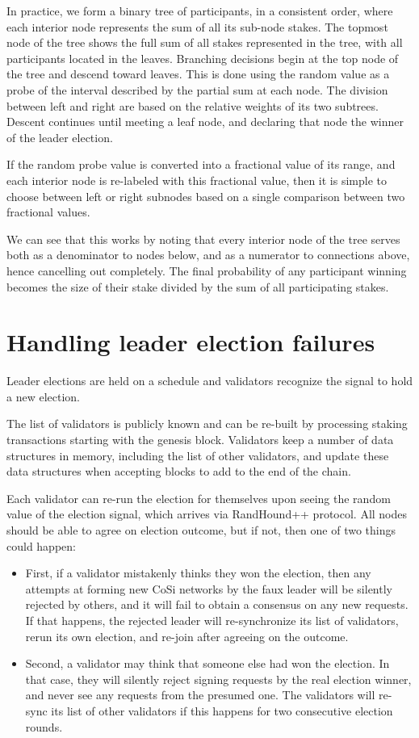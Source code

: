 \documentclass[8pt,fleqn,openany]{book}
\begin{document}
In practice, we form a binary tree of participants, in a consistent order, where each interior node represents the sum of all its sub-node stakes. The topmost node of the tree shows the full sum of all stakes represented in the tree, with all participants located in the leaves. Branching decisions begin at the top node of the tree and descend toward leaves. This is done using the random value as a probe of the interval described by the partial sum at each node. The division between left and right are based on the relative weights of its two subtrees. Descent continues until meeting a leaf node, and declaring that node the winner of the leader election. 

If the random probe value is converted into a fractional value of its range, and each interior node is re-labeled with this fractional value, then it is simple to choose between left or right subnodes based on a single comparison between two fractional values.

We can see that this works by noting that every interior node of the tree serves both as a denominator to nodes below, and as a numerator to connections above, hence cancelling out completely. The final probability of any participant winning becomes the size of their stake divided by the sum of all participating stakes.

\section{Handling leader election failures} 
Leader elections are held on a schedule and validators recognize the signal to hold a new election. 

The list of validators is publicly known and can be re-built by processing staking transactions starting with the genesis block. Validators keep a number of data structures in memory, including the list of other validators, and update these data structures when accepting blocks to add to the end of the chain.

Each validator can re-run the election for themselves upon seeing the random value of the election signal, which arrives via RandHound++ protocol. All nodes should be able to agree on election outcome, but if not, then one of two things could happen: 

\begin{itemize}
  \item{First, if a validator mistakenly thinks they won the election, then any attempts at forming new CoSi networks by the faux leader will be silently rejected by others, and it will fail to obtain a consensus on any new requests. If that happens, the rejected leader will re-synchronize its list of validators, rerun its own election, and re-join after agreeing on the outcome.} 
  \item{Second, a validator may think that someone else had won the election. In that case, they will silently reject signing requests by the real election winner, and never see any requests from the presumed one. The validators will re-sync its list of other validators if this happens for two consecutive election rounds.}
\end{itemize}
\end{document}
